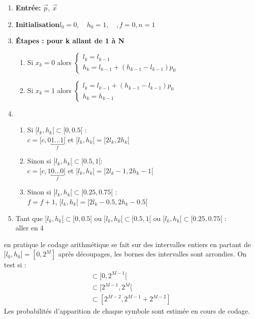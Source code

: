 \documentclass[main.tex]{subfiles}
\begin{document}
\begin{enumerate}
\item \textbf{Entrée:} $\vec{p}$, $\vec{x}$
\item \textbf{Initialisation}$l_0=0, \quad h_0 = 1,\quad, f=0, n=1$

\item \textbf{Étapes : pour k allant de 1 à N}
  \begin{enumerate}
  \item Si $x_k=0$ alors $  \begin{cases}
      l_k=l_{k-1} \\
      h_k=l_{k-1}+(h_{k-1}-l_{k-1})p_0
    \end{cases}$

  \item Si $x_k=1$ alors $
    \begin{cases}
      l_k=l_{k-1}+(h_{k-1}-l_{k-1})p_0 \\ h_k=h_{k-1}
    \end{cases}
    $
  \end{enumerate}
\item
  \begin{enumerate}
  \item Si $[l_k,h_k[ \subset [0,0.5[$ : \\
    $c = [c,0 \underbracket{1...1}_{f} [$ et $[l_k,h_k [ =  [2l_k,2h_k [ $
  \item Sinon si $[l_k,h_k[ \subset [0.5,1[$: \\
    $c =[c,1 \underbracket{0...0}_{f} [$ et $[l_k,h_k[ = [2l_{k}-1,2h_{k}-1[$
  \item Sinon si $[l_k,h_k[ \subset [0.25,0.75[ $ :\\
    $f= f+1$, $[l_k,h_k[ = [2l_k-0.5 , 2h_k-0.5[$
  \end{enumerate}
\item Tant que $[l_k,h_k[ \subset [0,0.5[ $ ou $[l_k,h_k[ \subset [0.5, 1 [ $ ou  $[l_k,h_k[ \subset [0.25,0.75[$ :\\
  aller en 4
\end{enumerate}

\begin{rem}
  en pratique le codage arithmétique se fait sur des intervalles entiers en partant de $[l_0,h_0[= [0,2^M]$ après découpages, les bornes des intervalles sont arrondies. On test si :
  \begin{align*}
    [l_k,h_k] &\subset [0,2^{M-1}[\\
              &\subset[2^{M-1},2^M[\\
              &\subset[2^{M-2},2^{M-1}+2^{M-2}]
  \end{align*}
Les probabilités d'apparition de chaque symbole sont estimée en cours de codage.
\end{rem}
\end{document}
